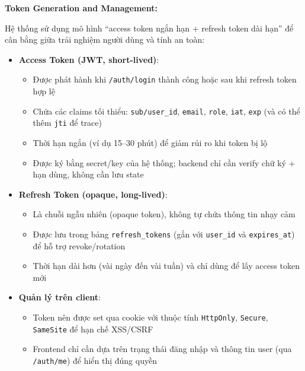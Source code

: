 
\noindent\textbf{Token Generation and Management:}

Hệ thống sử dụng mô hình ``access token ngắn hạn + refresh token dài hạn'' để cân bằng giữa trải nghiệm người dùng và tính an toàn:
\begin{itemize}
    \item \textbf{Access Token (JWT, short-lived)}:
    \begin{itemize}
        \item Được phát hành khi \texttt{/auth/login} thành công hoặc sau khi refresh token hợp lệ
        \item Chứa các claims tối thiểu: \texttt{sub/user\_id}, \texttt{email}, \texttt{role}, \texttt{iat}, \texttt{exp} (và có thể thêm \texttt{jti} để trace)
        \item Thời hạn ngắn (ví dụ 15--30 phút) để giảm rủi ro khi token bị lộ
        \item Được ký bằng secret/key của hệ thống; backend chỉ cần verify chữ ký + hạn dùng, không cần lưu state
    \end{itemize}

    \item \textbf{Refresh Token (opaque, long-lived)}:
    \begin{itemize}
        \item Là chuỗi ngẫu nhiên (opaque token), không tự chứa thông tin nhạy cảm
        \item Được lưu trong bảng \texttt{refresh\_tokens} (gắn với \texttt{user\_id} và \texttt{expires\_at}) để hỗ trợ revoke/rotation
        \item Thời hạn dài hơn (vài ngày đến vài tuần) và chỉ dùng để lấy access token mới
    \end{itemize}

    \item \textbf{Quản lý trên client}:
    \begin{itemize}
        \item Token nên được set qua cookie với thuộc tính \texttt{HttpOnly}, \texttt{Secure}, \texttt{SameSite} để hạn chế XSS/CSRF
        \item Frontend chỉ cần dựa trên trạng thái đăng nhập và thông tin user (qua \texttt{/auth/me}) để hiển thị đúng quyền
    \end{itemize}
\end{itemize}

